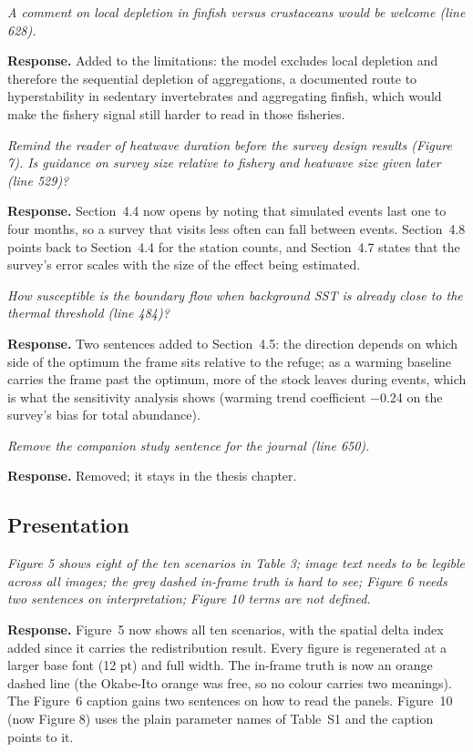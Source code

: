 \documentclass[11pt,a4paper]{article}
\newcommand{\rev}[1]{\par\medskip\noindent\textit{\color{black!60}#1}\par\smallskip}
\newcommand{\resp}{\noindent\textbf{Response.} }
\begin{document}
\rev{A comment on local depletion in finfish versus crustaceans would be welcome (line 628).}

\resp Added to the limitations: the model excludes local depletion and therefore the sequential depletion of aggregations, a documented route to hyperstability in sedentary invertebrates and aggregating finfish, which would make the fishery signal still harder to read in those fisheries.

\rev{Remind the reader of heatwave duration before the survey design results (Figure 7). Is guidance on survey size relative to fishery and heatwave size given later (line 529)?}

\resp Section~4.4 now opens by noting that simulated events last one to four months, so a survey that visits less often can fall between events. Section~4.8 points back to Section~4.4 for the station counts, and Section~4.7 states that the survey's error scales with the size of the effect being estimated.

\rev{How susceptible is the boundary flow when background SST is already close to the thermal threshold (line 484)?}

\resp Two sentences added to Section~4.5: the direction depends on which side of the optimum the frame sits relative to the refuge; as a warming baseline carries the frame past the optimum, more of the stock leaves during events, which is what the sensitivity analysis shows (warming trend coefficient $-$0.24 on the survey's bias for total abundance).

\rev{Remove the companion study sentence for the journal (line 650).}

\resp Removed; it stays in the thesis chapter.

\subsection*{Presentation}

\rev{Figure 5 shows eight of the ten scenarios in Table 3; image text needs to be legible across all images; the grey dashed in-frame truth is hard to see; Figure 6 needs two sentences on interpretation; Figure 10 terms are not defined.}

\resp Figure~5 now shows all ten scenarios, with the spatial delta index added since it carries the redistribution result. Every figure is regenerated at a larger base font (12 pt) and full width. The in-frame truth is now an orange dashed line (the Okabe-Ito orange was free, so no colour carries two meanings). The Figure~6 caption gains two sentences on how to read the panels. Figure~10 (now Figure 8) uses the plain parameter names of Table~S1 and the caption points to it.
\end{document}

